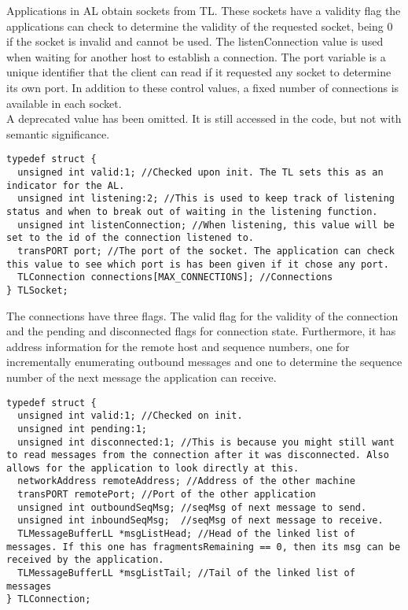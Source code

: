 Applications in AL obtain sockets from TL. These sockets have a validity flag the applications can check to determine the validity of the requested socket, being 0 if the socket is invalid and cannot be used. The listenConnection value is used when waiting for another host to establish a connection. The port variable is a unique identifier that the client can read if it requested any socket to determine its own port. In addition to these control values, a fixed number of connections is available in each socket.\\
A deprecated value has been omitted. It is still accessed in the code, but not with semantic significance.
\begin{lstlisting}
typedef struct {
  unsigned int valid:1; //Checked upon init. The TL sets this as an indicator for the AL.
  unsigned int listening:2; //This is used to keep track of listening status and when to break out of waiting in the listening function.
  unsigned int listenConnection; //When listening, this value will be set to the id of the connection listened to.
  transPORT port; //The port of the socket. The application can check this value to see which port is has been given if it chose any port.
  TLConnection connections[MAX_CONNECTIONS]; //Connections
} TLSocket;
\end{lstlisting}

The connections have three flags. The valid flag for the validity of the connection and the pending and disconnected flags for connection state. Furthermore, it has address information for the remote host and sequence numbers, one for incrementally enumerating outbound messages and one to determine the sequence number of the next message the application can receive.

\begin{lstlisting}
typedef struct {
  unsigned int valid:1; //Checked on init.
  unsigned int pending:1;
  unsigned int disconnected:1; //This is because you might still want to read messages from the connection after it was disconnected. Also allows for the application to look directly at this.
  networkAddress remoteAddress; //Address of the other machine
  transPORT remotePort; //Port of the other application
  unsigned int outboundSeqMsg; //seqMsg of next message to send.
  unsigned int inboundSeqMsg;  //seqMsg of next message to receive.
  TLMessageBufferLL *msgListHead; //Head of the linked list of messages. If this one has fragmentsRemaining == 0, then its msg can be received by the application.
  TLMessageBufferLL *msgListTail; //Tail of the linked list of messages
} TLConnection;
\end{lstlisting}

